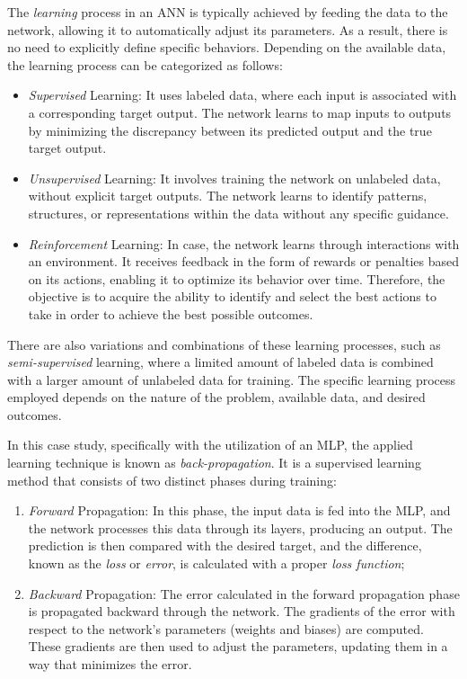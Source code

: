 The \textit{learning} process in an ANN is typically achieved by feeding the data to the network, allowing it to automatically adjust its parameters. As a result, there is no need to explicitly define specific behaviors. Depending on the available data, the learning process can be categorized as follows:


\begin{itemize}
	\item \textit{Supervised} Learning: It uses labeled data, where each input is associated with a corresponding target output. The network learns to map inputs to outputs by minimizing the discrepancy between its predicted output and the true target output.
	\item \textit{Unsupervised} Learning: It involves training the network on unlabeled data, without explicit target outputs. The network learns to identify patterns, structures, or representations within the data without any specific guidance.
	\item \textit{Reinforcement} Learning: In case, the network learns through interactions with an environment. It receives feedback in the form of rewards or penalties based on its actions, enabling it to optimize its behavior over time. Therefore, the objective is to acquire the ability to identify and select the best actions to take in order to achieve the best possible outcomes.
\end{itemize}

There are also variations and combinations of these learning processes, such as \textit{semi-supervised} learning, where a limited amount of labeled data is combined with a larger amount of unlabeled data for training. The specific learning process employed depends on the nature of the problem, available data, and desired outcomes.

In this case study, specifically with the utilization of an MLP, the applied learning technique is known as \textit{back-propagation}. It is a supervised learning method that consists of two distinct phases during training:
\begin{enumerate}
	\item \textit{Forward} Propagation: In this phase, the input data is fed into the MLP, and the network processes this data through its layers, producing an output. The prediction is then compared with the desired target, and the difference, known as the \textit{loss} or \textit{error}, is calculated with a proper \textit{loss function};
	\item \textit{Backward} Propagation: The error calculated in the forward propagation phase is propagated backward through the network. The gradients of the error with respect to the network's parameters (weights and biases) are computed. These gradients are then used to adjust the parameters, updating them in a way that minimizes the error.
\end{enumerate}

